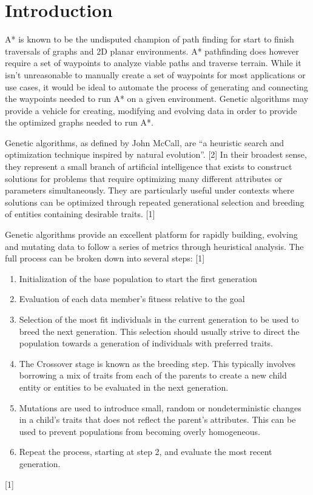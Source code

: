 \section{Introduction}
	A* is known to be the undisputed champion of path finding for start to finish traversals of graphs and 2D planar environments. A* pathfinding does however require a set of waypoints to analyze viable paths and traverse terrain. While it isn't unreasonable to manually create a set of waypoints for most applications or use cases, it would be ideal to automate the process of generating and connecting the waypoints needed to run A* on a given environment. Genetic algorithms may provide a vehicle for creating, modifying and evolving data in order to provide the optimized graphs needed to run A*.
	
	Genetic algorithms, as defined by John McCall, are “a heuristic search and optimization technique inspired by natural evolution”. [2] In their broadest sense, they represent a small branch of artificial intelligence that exists to construct solutions for problems that require optimizing many different attributes or parameters simultaneously. They are particularly useful under contexts where solutions can be optimized through repeated generational selection and breeding of entities containing desirable traits. [1]
	
	Genetic algorithms provide an excellent platform for rapidly building, evolving and mutating data to follow a series of metrics through heuristical analysis. The full process can be broken down into several steps: [1]
	
	\begin{enumerate}
		\item Initialization of the base population to start the first generation
		\item Evaluation of each data member's fitness relative to the goal
		\item Selection of the most fit individuals in the current generation to be used to breed the next generation. This selection should usually strive to direct the population towards a generation of individuals with preferred traits.
		\item The Crossover stage is known as the breeding step. This typically involves borrowing a mix of traits from each of the parents to create a new child entity or entities to be evaluated in the next generation.
		\item Mutations are used to introduce small, random or nondeterministic changes in a child's traits that does not reflect the parent’s attributes. This can be used to prevent populations from becoming overly homogeneous.
		\item Repeat the process, starting at step 2, and evaluate the most recent generation.
	\end{enumerate}
	[1]
	
